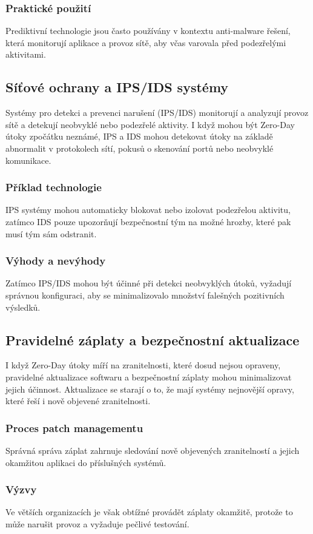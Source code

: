 \documentclass[11pt, conference, a4paper]{IEEEtran}
\begin{document}
\subsubsection{Praktické použití} Prediktivní technologie jsou často používány v kontextu anti-malware řešení, která monitorují aplikace a provoz sítě, aby včas varovala před podezřelými aktivitami.
\subsection{Síťové ochrany a IPS/IDS systémy \cite{Stallings}}
Systémy pro detekci a prevenci narušení (IPS/IDS) monitorují a analyzují provoz sítě a detekují neobvyklé nebo podezřelé aktivity. I když mohou být Zero-Day útoky zpočátku neznámé, IPS a IDS mohou detekovat útoky na základě abnormalit v protokolech sítí, pokusů o skenování portů nebo neobvyklé komunikace.

\subsubsection{Příklad technologie} IPS systémy mohou automaticky blokovat nebo izolovat podezřelou aktivitu, zatímco IDS pouze upozorňují bezpečnostní tým na možné hrozby, které pak musí tým sám odstranit.
\subsubsection{Výhody a nevýhody} Zatímco IPS/IDS mohou být účinné při detekci neobvyklých útoků, vyžadují správnou konfiguraci, aby se minimalizovalo množství falešných pozitivních výsledků.
\subsection{Pravidelné záplaty a bezpečnostní aktualizace \cite{Patching}}
I když Zero-Day útoky míří na zranitelnosti, které dosud nejsou opraveny, pravidelné aktualizace softwaru a bezpečnostní záplaty mohou minimalizovat jejich účinnost. Aktualizace se starají o to, že mají systémy nejnovější opravy, které řeší i nově objevené zranitelnosti.

\subsubsection{Proces patch managementu} Správná správa záplat zahrnuje sledování nově objevených zranitelností a jejich okamžitou aplikaci do příslušných systémů.
\subsubsection{Výzvy} Ve větších organizacích je však obtížné provádět záplaty okamžitě, protože to může narušit provoz a vyžaduje pečlivé testování.
\end{document}
